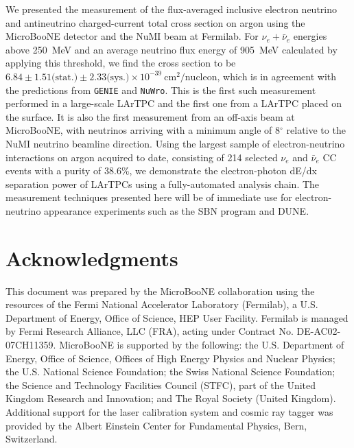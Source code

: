 \documentclass[%
 reprint,
 twocolumn,
superscriptaddress,
showpacs,preprintnumbers,
 amsmath,amssymb,
 aps,
prd,
longbibliography
]{revtex4-1}
\begin{document}
We presented the measurement of the flux-averaged inclusive electron neutrino and antineutrino charged-current total cross section on argon using the MicroBooNE detector and the NuMI beam at Fermilab. For $\nu_e + \bar{\nu}_e$ energies above 250~MeV and an average neutrino flux energy of 905~MeV calculated by applying this threshold, we find the cross section to be ${6.84\pm1.51\textrm{(stat.)}\pm2.33\textrm{(sys.)}\times 10^{-39}~\textrm{cm}^{2}/\textrm{nucleon}}$, which is in agreement with the predictions from \texttt{GENIE} and \texttt{NuWro}. This is the first such measurement performed in a large-scale LArTPC and the first one from a LArTPC placed on the surface. It is also the first measurement from an off-axis beam at MicroBooNE, with neutrinos arriving with a minimum angle of 8$^{\circ}$ relative to the NuMI neutrino beamline direction. Using the largest sample of electron-neutrino interactions on argon acquired to date, consisting of 214 selected $\nu_e$ and $\bar{\nu}_e$ CC events with a purity of 38.6\%, we demonstrate the electron-photon dE/dx separation power of LArTPCs using a fully-automated analysis chain. The measurement techniques presented here will be of immediate use for electron-neutrino appearance experiments such as the SBN program and DUNE.  


\section{Acknowledgments}
This document was prepared by the MicroBooNE collaboration using the
resources of the Fermi National Accelerator Laboratory (Fermilab), a
U.S. Department of Energy, Office of Science, HEP User Facility.
Fermilab is managed by Fermi Research Alliance, LLC (FRA), acting
under Contract No. DE-AC02-07CH11359.  MicroBooNE is supported by the
following: the U.S. Department of Energy, Office of Science, Offices
of High Energy Physics and Nuclear Physics; the U.S. National Science
Foundation; the Swiss National Science Foundation; the Science and
Technology Facilities Council (STFC), part of the United Kingdom Research and Innovation;
 and The Royal Society (United Kingdom).  Additional support for the laser
calibration system and cosmic ray tagger was provided by the Albert
Einstein Center for Fundamental Physics, Bern, Switzerland.

 
\end{document}
